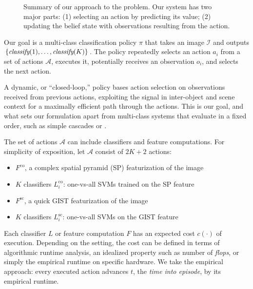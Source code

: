 \documentclass[runningheads]{llncs}
\begin{document}
\begin{figure}[h!]
  \caption{Summary of our approach to the problem. Our system has two major parts: (1) selecting an action by predicting its value; (2) updating the belief state with observations resulting from the action.}
  \label{fig:evaluation}
\end{figure}

Our goal is a multi-class classification policy $\pi$ that takes an image $\mathcal{I}$ and outputs $\{\emph{classify}(1), \dots, \emph{classify}(K)\}$.
The policy repeatedly selects an action $a_i$ from a set of actions $\mathcal{A}$, executes it, potentially receives an observation $o_i$, and selects the next action.

A dynamic, or ``closed-loop,'' policy bases action selection on observations received from previous actions, exploiting the signal in inter-object and scene context for a maximally efficient path through the actions.
This is our goal, and what sets our formulation apart from multi-class systems that evaluate in a fixed order, such as simple cascades \cite{Viola2001} or .

The set of actions $\mathcal{A}$ can include classifiers and feature computations.
For simplicity of exposition, let $\mathcal{A}$ consist of $2K+2$ actions:
\begin{itemize}
	\item $F^\text{co}$, a complex spatial pyramid (SP) featurization of the image
	\item $K$ classifiers $L^\text{co}_i$: one-vs-all SVMs trained on the SP feature
	\item $F^\text{sc}$, a quick GIST featurization of the image
	\item $K$ classifiers $L^\text{sc}_i$: one-vs-all SVMs on the GIST feature
\end{itemize}

Each classifier $L$ or feature computation $F$ has an expected cost $c(\cdot)$ of execution.
Depending on the setting, the cost can be defined in terms of algorithmic runtime analysis, an idealized property such as number of \emph{flops}, or simply the empirical runtime on specific hardware.
We take the empirical approach: every executed action advances $t$, the \emph{time into episode}, by its empirical runtime.
\end{document}
